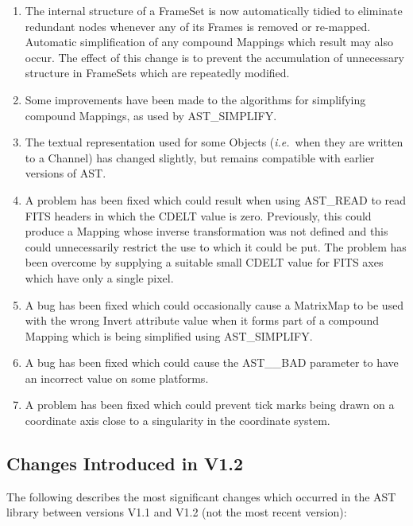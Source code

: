 \documentclass[twoside,11pt]{article}
\newcommand{\htmlref}[2]{#1}
\begin{document}
\begin{enumerate}
\item The internal structure of a FrameSet is now automatically tidied
to eliminate redundant nodes whenever any of its Frames is removed or
re-mapped. Automatic simplification of any compound Mappings which
result may also occur. The effect of this change is to prevent the
accumulation of unnecessary structure in FrameSets which are
repeatedly modified.

\item Some improvements have been made to the algorithms for
simplifying compound Mappings, as used by \htmlref{AST\_SIMPLIFY}{AST_SIMPLIFY}.

\item The textual representation used for some Objects
({\em{i.e.}}\ when they are written to a \htmlref{Channel}{Channel}) has changed
slightly, but remains compatible with earlier versions of AST.


\item A problem has been fixed which could result when using \htmlref{AST\_READ}{AST_READ}
to read FITS headers in which the CDELT value is zero. Previously,
this could produce a Mapping whose inverse transformation was not
defined and this could unnecessarily restrict the use to which it
could be put. The problem has been overcome by supplying a suitable
small CDELT value for FITS axes which have only a single pixel.

\item A bug has been fixed which could occasionally cause a \htmlref{MatrixMap}{MatrixMap}
to be used with the wrong \htmlref{Invert}{Invert} attribute value when it forms part of
a compound Mapping which is being simplified using AST\_SIMPLIFY.

\item A bug has been fixed which could cause the AST\_\_BAD parameter
to have an incorrect value on some platforms.

\item A problem has been fixed which could prevent tick marks being
drawn on a coordinate axis close to a singularity in the coordinate
system.
\end{enumerate}

\subsection{Changes Introduced in V1.2}

The following describes the most significant changes which occurred in
the AST library between versions V1.1 and V1.2 (not the most recent
version):
\end{document}
